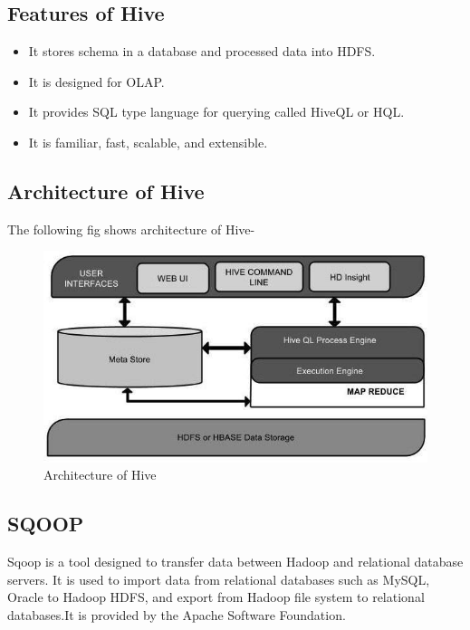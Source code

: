 \begin{itemize}
\subsection*{Features of Hive}
\begin{itemize}
	\item It stores schema in a database and processed data into HDFS.
\item It is designed for OLAP.
\item It provides SQL type language for querying called HiveQL or HQL.
\item It is familiar, fast, scalable, and extensible.
\end{itemize}
\subsection*{Architecture of Hive}
The following fig shows architecture of Hive-
\begin{figure}[h!]
	\centering
	\includegraphics[width=\linewidth]{hive_architecture.jpg}
	\caption{Architecture of Hive}
\end{figure}
\subsection{SQOOP}
Sqoop is a tool designed to transfer data between Hadoop and relational database servers. It is used to import data from relational databases such as MySQL, Oracle to Hadoop HDFS, and export from Hadoop file system to relational databases.It is provided by the Apache Software Foundation.

\end{itemize}
